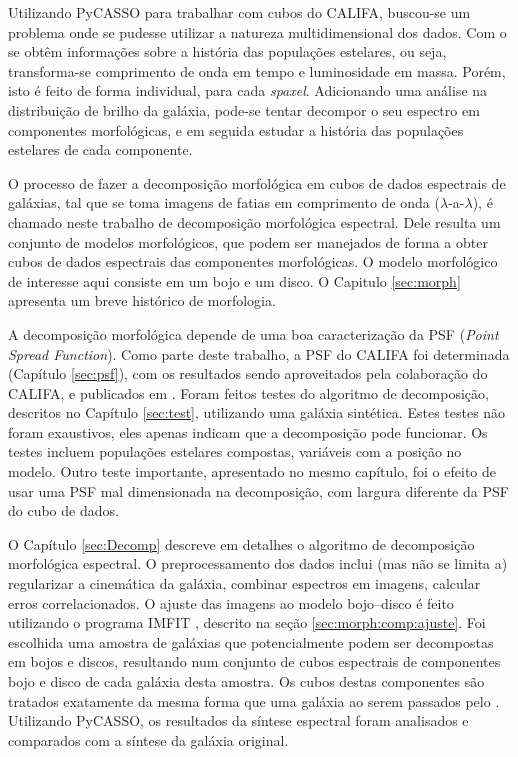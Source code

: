Utilizando PyCASSO para trabalhar com cubos do CALIFA, buscou-se um problema
onde se pudesse utilizar a natureza multidimensional dos dados. Com o \starlight
se obtêm informações sobre a história das populações estelares, ou seja,
transforma-se comprimento de onda em tempo e luminosidade em massa. Porém, isto
é feito de forma individual, para cada {\em spaxel}. Adicionando uma análise na
distribuição de brilho da galáxia, pode-se tentar decompor o seu espectro em
componentes morfológicas, e em seguida estudar a história das populações
estelares de cada componente.

O processo de fazer a decomposição morfológica em cubos de dados espectrais de
galáxias, tal que se toma imagens de fatias em comprimento de onda
($\lambda$-a-$\lambda$), é chamado neste trabalho de decomposição morfológica
espectral. Dele resulta um conjunto de modelos morfológicos, que podem ser
manejados de forma a obter cubos de dados espectrais das componentes
morfológicas. O modelo morfológico de interesse aqui consiste em um bojo e um
disco. O Capitulo \ref{sec:morph} apresenta um breve histórico de morfologia.

A decomposição morfológica depende de uma boa caracterização da PSF ({\em Point
Spread Function}). Como parte deste trabalho, a PSF do CALIFA foi determinada
(Capítulo \ref{sec:psf}), com os resultados sendo aproveitados pela colaboração
do CALIFA, e publicados em \citet{GarciaBenito2015}. Foram feitos testes do
algoritmo de decomposição, descritos no Capítulo \ref{sec:test}, utilizando uma
galáxia sintética. Estes testes não foram exaustivos, eles apenas indicam que a
decomposição pode funcionar. Os testes incluem populações estelares compostas,
variáveis com a posição no modelo. Outro teste importante, apresentado no mesmo
capítulo, foi o efeito de usar uma PSF mal dimensionada na decomposição, com
largura diferente da PSF do cubo de dados.

O Capítulo \ref{sec:Decomp} descreve em detalhes o algoritmo de decomposição
morfológica espectral. O preprocessamento dos dados inclui (mas não se limita a)
regularizar a cinemática da galáxia, combinar espectros em imagens, calcular
erros correlacionados. O ajuste das imagens ao modelo bojo--disco é feito
utilizando o programa IMFIT \citep{Erwin2015}, descrito na seção
\ref{sec:morph:comp:ajuste}. Foi escolhida uma amostra de galáxias que
potencialmente podem ser decompostas em bojos e discos, resultando num conjunto
de cubos espectrais de componentes bojo e disco de cada galáxia desta amostra.
Os cubos destas componentes são tratados exatamente da mesma forma que uma
galáxia ao serem passados pelo \starlight. Utilizando PyCASSO, os resultados da
síntese espectral foram analisados e comparados com a síntese da galáxia
original.


